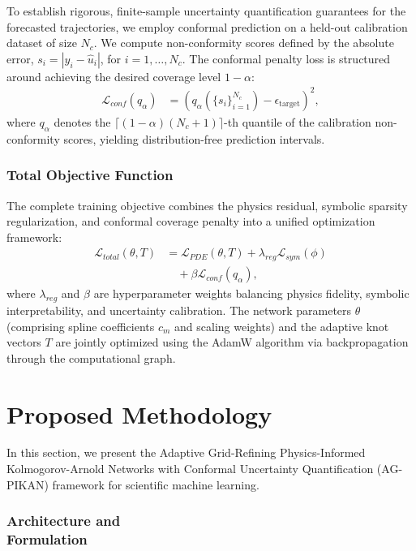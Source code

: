 \documentclass[10pt,twocolumn]{article}
\begin{document}
To establish rigorous, finite-sample uncertainty quantification guarantees for the forecasted trajectories, we employ conformal prediction on a held-out calibration dataset of size $N_c$. We compute non-conformity scores defined by the absolute error, $s_i = |y_i - \hat{u}_i|$, for $i = 1, \dots, N_c$. The conformal penalty loss is structured around achieving the desired coverage level $1-\alpha$:
\begin{equation}
\begin{aligned}
\mathcal{L}_{conf}(q_\alpha) &= \left( q_\alpha(\{s_i\}_{i=1}^{N_c}) - \epsilon_{\text{target}} \right)^2,
\end{aligned}
\end{equation}
where $q_\alpha$ denotes the $\lceil (1-\alpha)(N_c + 1) \rceil$-th quantile of the calibration non-conformity scores, yielding distribution-free prediction intervals.

\subsubsection{Total Objective Function}
The complete training objective combines the physics residual, symbolic sparsity regularization, and conformal coverage penalty into a unified optimization framework:
\begin{equation}
\begin{aligned}
\mathcal{L}_{total}(\theta, T) &= \mathcal{L}_{PDE}(\theta, T) 
+ \lambda_{reg} \mathcal{L}_{sym}(\phi) \\
&\quad + \beta \mathcal{L}_{conf}(q_\alpha),
\end{aligned}
\end{equation}
where $\lambda_{reg}$ and $\beta$ are hyperparameter weights balancing physics fidelity, symbolic interpretability, and uncertainty calibration. The network parameters $\theta$ (comprising spline coefficients $c_m$ and scaling weights) and the adaptive knot vectors $T$ are jointly optimized using the AdamW algorithm via backpropagation through the computational graph.

\section{Proposed Methodology}
In this section, we present the 
Adaptive Grid-Refining 
Physics-Informed 
Kolmogorov-Arnold Networks 
with Conformal Uncertainty 
Quantification (AG-PIKAN) 
framework for scientific 
machine learning.

\subsubsection{Architecture and \\ Formulation}
\end{document}
